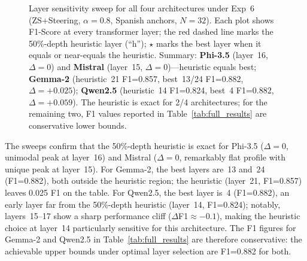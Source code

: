 \documentclass{ieeeaccess}
\begin{document}
\begin{figure}[htbp]
{
}%
\caption{Layer sensitivity sweep for all four architectures under Exp~6 (ZS+Steering, $\alpha=0.8$, Spanish anchors, $N=32$). Each plot shows F1-Score at every transformer layer; the red dashed line marks the 50\%-depth heuristic layer (``h''); $\star$ marks the best layer when it equals or near-equals the heuristic. Summary: \textbf{Phi-3.5} (layer~16, $\Delta=0$) and \textbf{Mistral} (layer~15, $\Delta=0$)---heuristic equals best; \textbf{Gemma-2} (heuristic~21 F1=0.857, best~13/24 F1=0.882, $\Delta=+0.025$); \textbf{Qwen2.5} (heuristic~14 F1=0.824, best~4 F1=0.882, $\Delta=+0.059$). The heuristic is exact for 2/4 architectures; for the remaining two, F1 values reported in Table~\ref{tab:full_results} are conservative lower bounds.}
\label{fig:layer_sensitivity}
\end{figure}

The sweeps confirm that the 50\%-depth heuristic is exact for Phi-3.5 ($\Delta=0$, unimodal peak at layer~16) and Mistral ($\Delta=0$, remarkably flat profile with unique peak at layer~15). For Gemma-2, the best layers are~13 and~24 (F1=0.882), both outside the heuristic region; the heuristic (layer~21, F1=0.857) leaves 0.025 F1 on the table. For Qwen2.5, the best layer is~4 (F1=0.882), an early layer far from the 50\%-depth heuristic (layer~14, F1=0.824); notably, layers~15--17 show a sharp performance cliff ($\Delta$F1$\approx-0.1$), making the heuristic choice at layer~14 particularly sensitive for this architecture. The F1 figures for Gemma-2 and Qwen2.5 in Table~\ref{tab:full_results} are therefore conservative: the achievable upper bounds under optimal layer selection are F1=0.882 for both.
\end{document}
